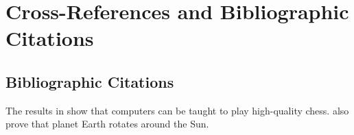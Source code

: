 \chapter{Cross-References and Bibliographic Citations}

\section{Bibliographic Citations}
The results in \citep{Prunescu2015} show that computers can be taught to play high-quality chess. \citet{Prunescu2013b} also prove that planet Earth rotates around the Sun.